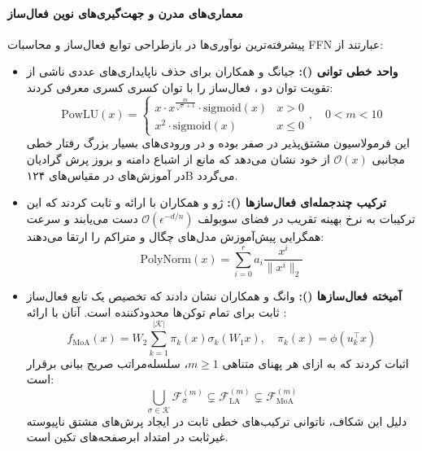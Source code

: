 \paragraph*{معماری‌های مدرن و جهت‌گیری‌های نوین فعال‌ساز }
پیشرفته‌ترین نوآوری‌ها در بازطراحی توابع فعال‌ساز و محاسبات FFN عبارتند از:
\begin{itemize}
    \item \textbf{واحد خطی توانی ():} جیانگ و همکاران \cite{jiang2026powlu} برای حذف ناپایداری‌های عددی ناشی از تقویت توان دو ، فعال‌ساز  را با توان کسری کسری معرفی کردند:
    \begin{equation}
        \text{PowLU}(x) = \begin{cases} 
            x \cdot x^{\frac{m}{\sqrt{x} + 1}} \cdot \text{sigmoid}(x) & x > 0 \\ 
            x^2 \cdot \text{sigmoid}(x) & x \le 0 
        \end{cases}, \quad 0 < m < 10
    \end{equation}
    این فرمولاسیون مشتق‌پذیر در صفر بوده و در ورودی‌های بسیار بزرگ رفتار خطی مجانبی $\mathcal{O}(x)$ از خود نشان می‌دهد که مانع از اشباع دامنه و بروز پرش گرادیان در آموزش‌های  در مقیاس‌های ۱۲۴B می‌گردد.

    \item \textbf{ترکیب چندجمله‌ای فعال‌ساز‌ها ():} ژو و همکاران \cite{zhuo2025polycom} با ارائه  و  ثابت کردند که این ترکیبات به نرخ بهینه تقریب در فضای سوبولف $\mathcal{O}(\epsilon^{-d/n})$ دست می‌یابند و سرعت همگرایی پیش‌آموزش مدل‌های چگال و متراکم را ارتقا می‌دهند:
    \begin{equation}
        \text{PolyNorm}(x) = \sum_{i=0}^r a_i \frac{x^i}{\|x^i\|_2}
    \end{equation}

    \item \textbf{آمیخته فعال‌ساز‌ها ():} وانگ و همکاران \cite{wang2026more} نشان دادند که تخصیص یک تابع فعال‌ساز ثابت برای تمام توکن‌ها محدودکننده است. آنان با ارائه :
    \begin{equation}
        f_{\text{MoA}}(x) = W_2 \sum_{k=1}^{|\mathcal{K}|} \pi_k(x) \sigma_k(W_1 x), \quad \pi_k(x) = \phi(u_k^\top x)
    \end{equation}
    اثبات کردند که به ازای هر پهنای متناهی $m \ge 1$، سلسله‌مراتب صریح بیانی برقرار است:
    \begin{equation}
        \bigcup_{\sigma \in \mathcal{K}} \mathcal{F}_\sigma^{(m)} \subsetneq \mathcal{F}_{\text{LA}}^{(m)} \subsetneq \mathcal{F}_{\text{MoA}}^{(m)}
    \end{equation}
    دلیل این شکاف، ناتوانی ترکیب‌های خطی ثابت در ایجاد پرش‌های مشتق ناپیوسته غیرثابت در امتداد ابرصفحه‌های تکین است.


\end{itemize}
